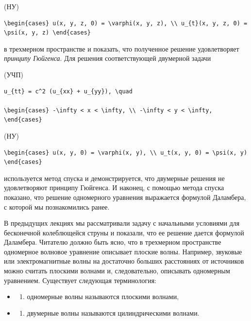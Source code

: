 \documentclass[
  ukrainian,
]{article}
\providecommand{\tightlist}{%
  \setlength{\itemsep}{0pt}\setlength{\parskip}{0pt}}
\begin{document}
(НУ)

\begin{verbatim}
\begin{cases} u(x, y, z, 0) = \varphi(x, y, z), \\ u_{t}(x, y, z, 0) = \psi(x, y, z) \end{cases}
\end{verbatim}

в трехмерном пространстве и показать, что полученное решение
удовлетворяет \emph{принципу Гюйгенса}. Для решения соответствующей
двумерной задачи

(УЧП)

\begin{verbatim}
u_{tt} = c^2 (u_{xx} + u_{yy}), \quad

\begin{cases} -\infty < x < \infty, \\ -\infty < y < \infty, \end{cases}
\end{verbatim}

(НУ)

\begin{verbatim}
\begin{cases} u(x, y, 0) = \varphi(x, y), \\ u_t(x, y, 0) = \psi(x, y) \end{cases}
\end{verbatim}

используется метод спуска и демонстрируется, что двумерные решения не
удовлетворяют принципу Гюйгенса. И наконец, с помощью метода спуска
показано, что решение одномерного уравнения выражается формулой
Даламбера, с которой мы познакомились ранее.

В предыдущих лекциях мы рассматривали задачу с начальными условиями для
бесконечной колеблющейся струны и показали, что ее решение дается
формулой Даламбера. Читателю должно быть ясно, что в трехмерном
пространстве одномерное волновое уравнение описывает плоские волны.
Например, звуковые или электромагнитные волны на достаточно больших
расстояниях от источников можно считать плоскими волнами и,
следовательно, описывать одномерным уравнением. Существует следующая
терминология:

\begin{itemize}
\tightlist
\item
  \begin{enumerate}
  \def\labelenumi{\arabic{enumi})}
  \tightlist
  \item
    одномерные волны называются плоскими волнами,
  \end{enumerate}
\item
  \begin{enumerate}
  \def\labelenumi{\arabic{enumi})}
  \setcounter{enumi}{1}
  \tightlist
  \item
    двумерные волны называются цилиндрическими волнами.
  \end{enumerate}
\end{itemize}
\end{document}
